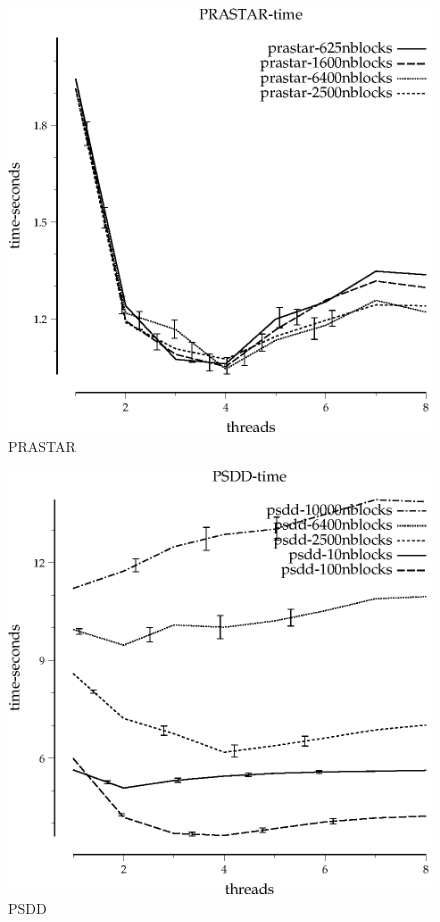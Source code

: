 \documentclass{article}
\begin{document}
\begin{figure}
\begin{center}
\includegraphics{PRASTAR-time}
\end{center}
\caption{PRASTAR}
\end{figure}

\begin{figure}
\begin{center}
\includegraphics{PSDD-time}
\end{center}
\caption{PSDD}
\end{figure}
\end{document}
